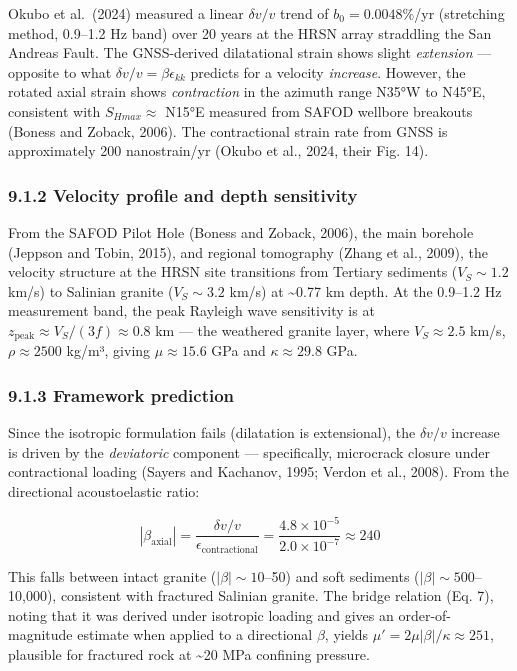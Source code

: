 \documentclass[12pt]{article}
\begin{document}
Okubo et al.~(2024) measured a linear \(\delta v/v\) trend of
\(b_0 = 0.0048\%\)/yr (stretching method, 0.9--1.2 Hz band) over 20
years at the HRSN array straddling the San Andreas Fault. The
GNSS-derived dilatational strain shows slight \emph{extension} ---
opposite to what \(\delta v/v = \beta\epsilon_{kk}\) predicts for a
velocity \emph{increase}. However, the rotated axial strain shows
\emph{contraction} in the azimuth range N35°W to N45°E, consistent with
\(S_{Hmax} \approx\) N15°E measured from SAFOD wellbore breakouts
(Boness and Zoback, 2006). The contractional strain rate from GNSS is
approximately 200 nanostrain/yr (Okubo et al., 2024, their Fig. 14).

\subsubsection{9.1.2 Velocity profile and depth
sensitivity}\label{velocity-profile-and-depth-sensitivity}

From the SAFOD Pilot Hole (Boness and Zoback, 2006), the main borehole
(Jeppson and Tobin, 2015), and regional tomography (Zhang et al., 2009),
the velocity structure at the HRSN site transitions from Tertiary
sediments (\(V_S \sim 1.2\) km/s) to Salinian granite (\(V_S \sim 3.2\)
km/s) at \textasciitilde0.77 km depth. At the 0.9--1.2 Hz measurement
band, the peak Rayleigh wave sensitivity is at
\(z_{\text{peak}} \approx V_S/(3f) \approx 0.8\) km --- the weathered
granite layer, where \(V_S \approx 2.5\) km/s, \(\rho \approx 2500\)
kg/m³, giving \(\mu \approx 15.6\) GPa and \(\kappa \approx 29.8\) GPa.

\subsubsection{9.1.3 Framework prediction}\label{framework-prediction}

Since the isotropic formulation fails (dilatation is extensional), the
\(\delta v/v\) increase is driven by the \emph{deviatoric} component ---
specifically, microcrack closure under contractional loading (Sayers and
Kachanov, 1995; Verdon et al., 2008). From the directional
acoustoelastic ratio:

\[|\beta_{\text{axial}}| = \frac{\delta v/v}{\epsilon_{\text{contractional}}} = \frac{4.8 \times 10^{-5}}{2.0 \times 10^{-7}} \approx 240\]

This falls between intact granite (\(|\beta| \sim 10\)--50) and soft
sediments (\(|\beta| \sim 500\)--10,000), consistent with fractured
Salinian granite. The bridge relation (Eq. 7), noting that it was
derived under isotropic loading and gives an order-of-magnitude estimate
when applied to a directional \(\beta\), yields
\(\mu' = 2\mu|\beta|/\kappa \approx 251\), plausible for fractured rock
at \textasciitilde20 MPa confining pressure.
\end{document}
